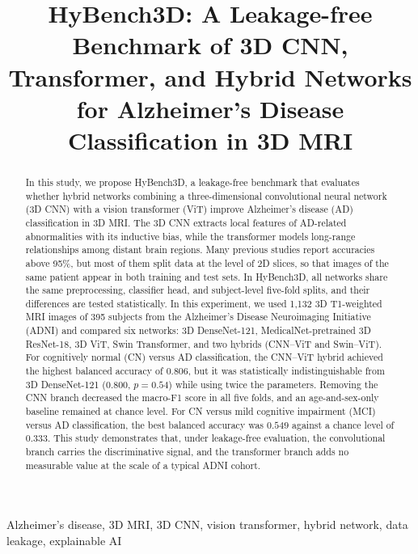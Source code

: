 \documentclass[conference,a4paper]{IEEEtran}
\begin{document}
\title{HyBench3D: A Leakage-free Benchmark of 3D CNN, Transformer, and Hybrid Networks for Alzheimer's Disease Classification in 3D MRI}

\author{
}

\maketitle

\begin{abstract}
In this study, we propose HyBench3D, a leakage-free benchmark that evaluates whether hybrid networks combining a three-dimensional convolutional neural network (3D CNN) with a vision transformer (ViT) improve Alzheimer's disease (AD) classification in 3D MRI. The 3D CNN extracts local features of AD-related abnormalities with its inductive bias, while the transformer models long-range relationships among distant brain regions. Many previous studies report accuracies above 95\%, but most of them split data at the level of 2D slices, so that images of the same patient appear in both training and test sets. In HyBench3D, all networks share the same preprocessing, classifier head, and subject-level five-fold splits, and their differences are tested statistically. In this experiment, we used 1{,}132 3D T1-weighted MRI images of 395 subjects from the Alzheimer's Disease Neuroimaging Initiative (ADNI) and compared six networks: 3D DenseNet-121, MedicalNet-pretrained 3D ResNet-18, 3D ViT, Swin Transformer, and two hybrids (CNN--ViT and Swin--ViT). For cognitively normal (CN) versus AD classification, the CNN--ViT hybrid achieved the highest balanced accuracy of $0.806$, but it was statistically indistinguishable from 3D DenseNet-121 ($0.800$, $p=0.54$) while using twice the parameters. Removing the CNN branch decreased the macro-F1 score in all five folds, and an age-and-sex-only baseline remained at chance level. For CN versus mild cognitive impairment (MCI) versus AD classification, the best balanced accuracy was $0.549$ against a chance level of $0.333$. This study demonstrates that, under leakage-free evaluation, the convolutional branch carries the discriminative signal, and the transformer branch adds no measurable value at the scale of a typical ADNI cohort.
\end{abstract}

\begin{IEEEkeywords}
Alzheimer's disease, 3D MRI, 3D CNN, vision transformer, hybrid network, data leakage, explainable AI
\end{IEEEkeywords}
\end{document}
